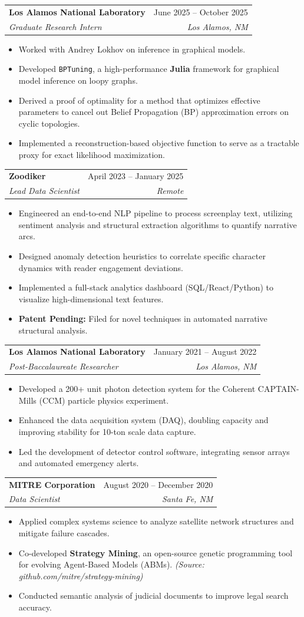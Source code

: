 \documentclass[letterpaper,11pt]{article}
\makeatletter
\newcommand{\resumeItem}[1]{
  \item\small{
    {#1 \vspace{-2pt}}
  }
}
\newcommand{\resumeSubheading}[4]{
  \vspace{-2pt}\item
    \begin{tabular*}{0.97\textwidth}[t]{l@{\extracolsep{\fill}}r}
      \textbf{#1} & #2 \\
      \textit{\small#3} & \textit{\small #4} \\
    \end{tabular*}\vspace{-7pt}
}
\newcommand{\resumeItemListStart}{\begin{itemize}}
\newcommand{\resumeItemListEnd}{\end{itemize}\vspace{-5pt}}
\makeatother
\begin{document}
    \resumeSubheading{Los Alamos National Laboratory}{June 2025 -- October 2025}
      {Graduate Research Intern}{Los Alamos, NM}
      \resumeItemListStart
        \resumeItem{Worked with Andrey Lokhov on inference in graphical models.}
        \resumeItem{Developed \texttt{BPTuning}, a high-performance \textbf{Julia} framework for graphical model inference on loopy graphs.}
        \resumeItem{Derived a proof of optimality for a method that optimizes effective parameters to cancel out Belief Propagation (BP) approximation errors on cyclic topologies.}
        \resumeItem{Implemented a reconstruction-based objective function to serve as a tractable proxy for exact likelihood maximization.}
      \resumeItemListEnd

    \resumeSubheading{Zoodiker}{April 2023 -- January 2025}
      {Lead Data Scientist}{Remote}
      \resumeItemListStart
        \resumeItem{Engineered an end-to-end NLP pipeline to process screenplay text, utilizing sentiment analysis and structural extraction algorithms to quantify narrative arcs.}
        \resumeItem{Designed anomaly detection heuristics to correlate specific character dynamics with reader engagement deviations.}
        \resumeItem{Implemented a full-stack analytics dashboard (SQL/React/Python) to visualize high-dimensional text features.}
        \resumeItem{\textbf{Patent Pending:} Filed for novel techniques in automated narrative structural analysis.}
      \resumeItemListEnd

    \resumeSubheading{Los Alamos National Laboratory}{January 2021 -- August 2022}
      {Post-Baccalaureate Researcher}{Los Alamos, NM}
      \resumeItemListStart
        \resumeItem{Developed a 200+ unit photon detection system for the Coherent CAPTAIN-Mills (CCM) particle physics experiment.}
        \resumeItem{Enhanced the data acquisition system (DAQ), doubling capacity and improving stability for 10-ton scale data capture.}
        \resumeItem{Led the development of detector control software, integrating sensor arrays and automated emergency alerts.}
      \resumeItemListEnd

    \resumeSubheading{MITRE Corporation}{August 2020 -- December 2020}
      {Data Scientist}{Santa Fe, NM}
      \resumeItemListStart
        \resumeItem{Applied complex systems science to analyze satellite network structures and mitigate failure cascades.}
        \resumeItem{Co-developed \textbf{Strategy Mining}, an open-source genetic programming tool for evolving Agent-Based Models (ABMs). \emph{(Source: github.com/mitre/strategy-mining)}}
        \resumeItem{Conducted semantic analysis of judicial documents to improve legal search accuracy.}
      \resumeItemListEnd
\end{document}
